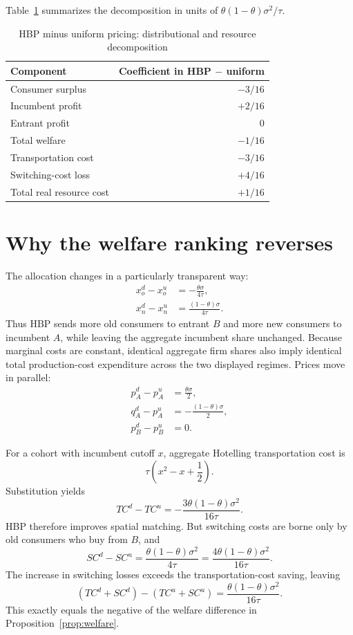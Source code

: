 \documentclass[11pt]{article}
\begin{document}
Table~\ref{tab:welfare} summarizes the decomposition in units of
$\theta(1-\theta)\sigma^2/\tau$.

\begin{table}[ht]
\centering
\caption{HBP minus uniform pricing: distributional and resource decomposition}
\label{tab:welfare}
\begin{tabular}{lr}
\toprule
Component & Coefficient in HBP $-$ uniform \\
\midrule
Consumer surplus & $-3/16$ \\
Incumbent profit & $+2/16$ \\
Entrant profit & $0$ \\
\midrule
Total welfare & $-1/16$ \\
\midrule
Transportation cost & $-3/16$ \\
Switching-cost loss & $+4/16$ \\
Total real resource cost & $+1/16$ \\
\bottomrule
\end{tabular}
\end{table}

\section{Why the welfare ranking reverses}

The allocation changes in a particularly transparent way:
\begin{align}
 x_o^d-x_o^u&=-\frac{\theta\sigma}{4\tau},\\
 x_n^d-x_n^u&=\frac{(1-\theta)\sigma}{4\tau}.
\end{align}
Thus HBP sends more old consumers to entrant $B$ and more new consumers to
incumbent $A$, while leaving the aggregate incumbent share unchanged.  Because
marginal costs are constant, identical aggregate firm shares also imply
identical total production-cost expenditure across the two displayed regimes.
Prices move in parallel:
\begin{align}
 p_A^d-p_A^u&=\frac{\theta\sigma}{2},\\
 q_A^d-p_A^u&=-\frac{(1-\theta)\sigma}{2},\\
 p_B^d-p_B^u&=0.
\end{align}

For a cohort with incumbent cutoff $x$, aggregate Hotelling transportation cost
is
\[
 \tau\left(x^2-x+\frac12\right).
\]
Substitution yields
\[
 TC^d-TC^u
 =-\frac{3\theta(1-\theta)\sigma^2}{16\tau}.
\]
HBP therefore improves spatial matching. But switching costs are borne only by
old consumers who buy from $B$, and
\[
 SC^d-SC^u
 =\frac{\theta(1-\theta)\sigma^2}{4\tau}
 =\frac{4\theta(1-\theta)\sigma^2}{16\tau}.
\]
The increase in switching losses exceeds the transportation-cost saving,
leaving
\[
 (TC^d+SC^d)-(TC^u+SC^u)
 =\frac{\theta(1-\theta)\sigma^2}{16\tau}.
\]
This exactly equals the negative of the welfare difference in
Proposition~\ref{prop:welfare}.
\end{document}
